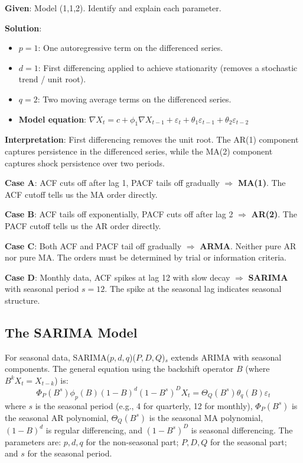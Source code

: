 \documentclass[11pt,a4paper]{article}
\begin{document}
\begin{tcolorbox}[colback=blue!5!white,colframe=blue!75!black,title=\textbf{Worked Example 7: ARIMA Parameter Interpretation}]
\textbf{Given}: Model (1,1,2). Identify and explain each parameter.

\textbf{Solution}:
\begin{itemize}
    \item $p=1$: One autoregressive term on the differenced series.
    \item $d=1$: First differencing applied to achieve stationarity (removes a stochastic trend / unit root).
    \item $q=2$: Two moving average terms on the differenced series.
    \item \textbf{Model equation}: $\nabla X_t = c + \phi_1 \nabla X_{t-1} + \varepsilon_t + \theta_1 \varepsilon_{t-1} + \theta_2 \varepsilon_{t-2}$
\end{itemize}

\textbf{Interpretation}: First differencing removes the unit root. The AR(1) component captures persistence in the differenced series, while the MA(2) component captures shock persistence over two periods.
\end{tcolorbox}

\begin{tcolorbox}[colback=green!5!white,colframe=green!75!black,title=\textbf{Worked Example 8: ACF/PACF Identification Cases}]
\textbf{Case A}: ACF cuts off after lag 1, PACF tails off gradually $\Rightarrow$ \textbf{MA(1)}. The ACF cutoff tells us the MA order directly.

\textbf{Case B}: ACF tails off exponentially, PACF cuts off after lag 2 $\Rightarrow$ \textbf{AR(2)}. The PACF cutoff tells us the AR order directly.

\textbf{Case C}: Both ACF and PACF tail off gradually $\Rightarrow$ \textbf{ARMA}. Neither pure AR nor pure MA. The orders must be determined by trial or information criteria.

\textbf{Case D}: Monthly data, ACF spikes at lag 12 with slow decay $\Rightarrow$ \textbf{SARIMA} with seasonal period $s=12$. The spike at the seasonal lag indicates seasonal structure.
\end{tcolorbox}

\subsection{The SARIMA Model}

For seasonal data, SARIMA($p,d,q$)($P,D,Q$)$_s$ extends ARIMA with seasonal components. The general equation using the backshift operator $B$ (where $B^k X_t = X_{t-k}$) is:
\[
\Phi_P(B^s)\phi_p(B)(1-B)^d(1-B^s)^D X_t = \Theta_Q(B^s)\theta_q(B)\varepsilon_t
\]
where $s$ is the seasonal period (e.g., 4 for quarterly, 12 for monthly), $\Phi_P(B^s)$ is the seasonal AR polynomial, $\Theta_Q(B^s)$ is the seasonal MA polynomial, $(1-B)^d$ is regular differencing, and $(1-B^s)^D$ is seasonal differencing. The parameters are: $p,d,q$ for the non-seasonal part; $P,D,Q$ for the seasonal part; and $s$ for the seasonal period.
\end{document}
